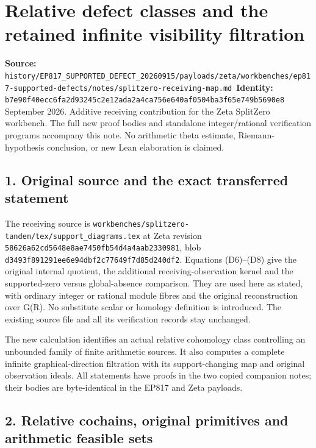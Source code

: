 \chapter{Relative defect classes and the retained infinite visibility filtration}
\label{chapter:13_splitzero-receiving-map}
{\small\noindent\textbf{Source:} \nolinkurl{history/EP817_SUPPORTED_DEFECT_20260915/payloads/zeta/workbenches/ep817-supported-defects/notes/splitzero-receiving-map.md}\
\textbf{Identity:} \nolinkurl{b7e90f40ecc6fa2d93245c2e12ada2a4ca756e640af0504ba3f65e749b5690e8}}
 September 2026. Additive receiving contribution for the Zeta SplitZero workbench. The full new proof bodies and standalone integer/rational verification programs accompany this note. No arithmetic theta estimate, Riemann-hypothesis conclusion, or new Lean elaboration is claimed.

\section{1. Original source and the exact transferred statement}\label{n13-original-source-and-the-exact-transferred-statement}

The receiving source is \nolinkurl{workbenches/splitzero-tandem/tex/support_diagrams.tex} at Zeta revision \nolinkurl{58626a62cd5648e8ae7450fb54d4a4aab2330981}, blob \nolinkurl{d3493f891291ee6e94dbf2c77649f7d85d240df2}. Equations (D6)--(D8) give the original internal quotient, the additional receiving-observation kernel and the supported-zero versus global-absence comparison. They are used here as stated, with ordinary integer or rational module fibres and the original reconstruction over G(R). No substitute scalar or homology definition is introduced. The existing source file and all its verification records stay unchanged.

The new calculation identifies an actual relative cohomology class controlling an unbounded family of finite arithmetic sources. It also computes a complete infinite graphical-direction filtration with its support-changing map and original observation ideals. All statements have proofs in the two copied companion notes; their bodies are byte-identical in the EP817 and Zeta payloads.

\section{2. Relative cochains, original primitives and arithmetic feasible sets}\label{n13-relative-cochains-original-primitives-and-arithmetic-feasible-sets}

